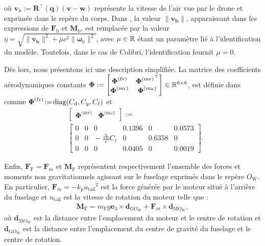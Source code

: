 où $\boldsymbol{v}_{\text{b}} := \boldsymbol{R}^\top(\boldsymbol{q}) (\boldsymbol{v}-\boldsymbol{w})$ représente la vitesse de l'air vue par le drone et exprimée dans le repère du corps. Dans \cite{lustosaHal-03035938}, la valeur $\lVert \boldsymbol{v_{\text{b}}} \rVert$, apparaissant dans les expressions de  $\boldsymbol{F}_{\text{b}}$ et $\boldsymbol{M}_{\text{b}}$, est remplacée par la valeur $\eta = \sqrt{\lVert \boldsymbol{v_{\text{b}}} \rVert^{2} + \mu c^{2} \lVert \boldsymbol{\omega}_{\text{b}} \rVert^{2}}$, avec $\mu \in {\mathbb R}$ étant un paramètre lié à l'identification du modèle. Toutefois, dans le cas de Colibri, l'identification fournit $\mu = 0$. 

Dès lors, nous présentons ici une description simplifiée. La matrice des coefficients aérodynamiques constants 
$\boldsymbol{\Phi}:= \begin{bmatrix} \boldsymbol{\Phi}^{\text{(fv)}} & {\boldsymbol{\Phi}^{\text{(mv)}}}^\top \\ \boldsymbol{\Phi}^{\text{(mv)}} & \boldsymbol{\Phi}^{\text{(m$\omega$)}} \end{bmatrix} \in {\mathbb R}^{6 \times 6}$, est définie dans \cite[eqs. (6)--(9)]{olszaneckibarthHal-02542982} comme $ \boldsymbol{\Phi}^{\text{(fv)}} \!:=\! \operatorname{diag}(C_{\text{d}},C_{y}, C_{\ell})$ et
\begin{align*}
&\left[ \begin{array}{c|c}
    \boldsymbol{\Phi}^{\text{(mv)}}  &  \boldsymbol{\Phi}^{\text{(m$\omega$)}} 
\end{array}\right] :=\\ 
&\left[ \begin{array}{ccc|ccc}
    0 & 0 & 0    &                                          0.1396 & 0 & 0.0573 \\
    0 & 0 & \!\!\!\!\! -\frac{\Delta_{\text{r}}}{c}C_{\ell} &    0 &  0.6358  & 0 \\
    0 & 0 & 0 &     0.0405 & 0 & 0.0019 
\end{array}\right].
\end{align*}




Enfin, $\boldsymbol{F}_{\text{F}} = \boldsymbol{F}_{m}$ et $\boldsymbol{M}_{\text{F}}$ représentent respectivement l'ensemble des forces et moments non gravitationnels agissant sur le fuselage exprimés dans le repère $O_{\text{W}}$. En particulier, $\boldsymbol{F}_{m} = - k_{\text{p}} {u_{\text{tail}}}^{2}$ est la force générée par le moteur situé à l'arrière du fuselage et $u_{\text{tail}}$ est la vitesse de rotation du moteur telle que :
\begin{align}
    \boldsymbol{M}_{\text{F}} =  m_{\text{F}} g \boldsymbol{e}_3 \times \boldsymbol{d}_{\text{G}O_{\text{W}}} + \boldsymbol{F}_{m} \times \boldsymbol{d}_{\text{M}O_{\text{W}}},
\end{align}
où $\boldsymbol{d}_{\text{M}O_{\text{W}}}$ est la distance entre l'emplacement du moteur et le centre de rotation et $\boldsymbol{d}_{\text{G}O_{\text{W}}}$ est la distance entre l'emplacement du centre de gravité du fuselage et le centre de rotation.



